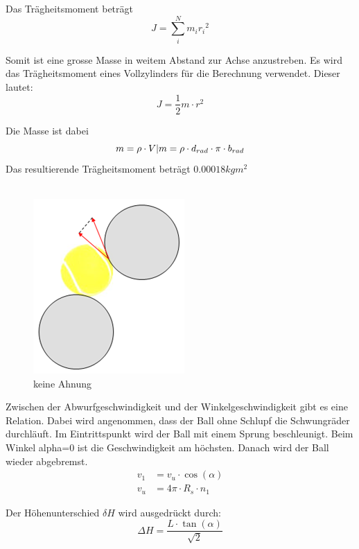 Das Trägheitsmoment beträgt
\begin{equation}
    J = \sum_{i}^{N} m_ir_i{^{2}}
\end{equation}

Somit ist eine grosse Masse in weitem Abstand zur Achse anzustreben. Es wird das Trägheitsmoment eines Vollzylinders für die Berechnung verwendet. Dieser lautet:
\begin{equation}
    J = \frac{1}{2} m \cdot r^2
\end{equation}

Die Masse ist dabei 	
\begin{equation}
    m = \rho \cdot V \\\lvert\\ m = \rho \cdot d_{rad} \cdot \pi \cdot b_{rad}
\end{equation}
Das resultierende Trägheitsmoment beträgt $0.00018 kg m^2$\\
\\
\begin{figure}
    \includegraphics[scale=0.75]{Enddokumentation/Anhang/Bilder/AbwurfBild.png}
    \centering
    \caption{keine Ahnung}
    \label{abb:AbwurfBild}
\end{figure}
Zwischen der Abwurfgeschwindigkeit und der Winkelgeschwindigkeit gibt es eine Relation. Dabei wird angenommen, dass der Ball ohne Schlupf die Schwungräder durchläuft. Im Eintrittspunkt wird der Ball mit einem Sprung beschleunigt. Beim Winkel alpha=0 ist die Geschwindigkeit am höchsten. Danach wird der Ball wieder abgebremst.
\begin{align}
v_1 &= v_u \cdot \cos(\alpha)\\
v_u &= 4\pi \cdot R_s \cdot n_1
\end{align}

Der Höhenunterschied $\delta H$ wird ausgedrückt durch:
\begin{equation}
    \Delta H = \frac{L \cdot \tan(\alpha)}{\sqrt{2}}
\end{equation}

